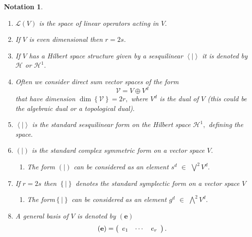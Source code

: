 \documentclass[aps,preprint]{revtex4}%
\newtheorem{notation}[theorem]{Notation}
\begin{document}
\begin{notation}
\begin{enumerate}
\item $\mathcal{L}\left(  V\right)  $ is the space of linear operators acting
in $V.$

\item If $V$ is even dimensional then $r=2s.$

\item If $V$ has a Hilbert space structure given by a sesquilinear
$\left\langle \left.  {}\right\vert \right\rangle $ it is denoted by
$\mathcal{H}$ or $\mathcal{H}^{1}.$

\item Often we consider direct sum vector spaces of the form
\begin{equation}
\mathcal{V}=V\oplus V^{d}%
\end{equation}
that have dimension $\dim\left\{  \mathcal{V}\right\}  =2r,$ where $V^{d}$ is
the dual of $V$ (this could be the algebraic dual or a topological dual)$.$

\item $\left\langle \left.  {}\right\vert \right\rangle $ is the standard
sesquilinear form on the Hilbert space $\mathcal{H}^{1},$ defining the
space$.$

\item $\left(  \left.  {}\right\vert \right)  $ is the standard complex
symmetric form on a vector space $V.$

\begin{enumerate}
\item The form $\left(  \left.  {}\right\vert \right)  $ can be considered as
an element $s^{d}$ $\in$ $%
{\textstyle\bigvee\nolimits^{2}}
V^{d}.$
\end{enumerate}

\item If $r=2s$ then $\left\{  \left.  {}\right\vert \right\}  $ denotes the
standard symplectic form on a vector space $V$

\begin{enumerate}
\item The form$\left\{  \left.  {}\right\vert \right\}  $ can be considered as
an element $g^{d}$ $\in$ $%
{\textstyle\bigwedge\nolimits^{2}}
V^{d}.$
\end{enumerate}

\item A general basis of $V$ is denoted by $\left(  \mathbf{e}\right)  $
\begin{equation}
\left(  \mathbf{e}\right)  =\left(
\begin{array}
[c]{ccc}%
e_{1} & \cdots & e_{r}%
\end{array}
\right)  .
\end{equation}



\end{enumerate}
\end{notation}
\end{document}
